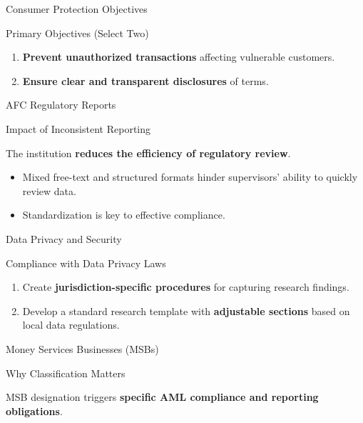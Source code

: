 \documentclass{beamer}
\begin{document}
	\begin{frame}{Consumer Protection Objectives}
		\begin{block}{Primary Objectives (Select Two)}
			\begin{enumerate}
				\item \textbf{Prevent unauthorized transactions} affecting vulnerable customers.
				\item \textbf{Ensure clear and transparent disclosures} of terms.
			\end{enumerate}
		\end{block}
	\end{frame}
	
	\begin{frame}{AFC Regulatory Reports}
		\begin{block}{Impact of Inconsistent Reporting}
			\begin{center}
				The institution \textbf{reduces the efficiency of regulatory review}.
			\end{center}
		\end{block}
		\begin{itemize}
			\item Mixed free-text and structured formats hinder supervisors' ability to quickly review data.
			\item Standardization is key to effective compliance.
		\end{itemize}
	\end{frame}
	
	\begin{frame}{Data Privacy and Security}
		\begin{block}{Compliance with Data Privacy Laws}
			\begin{enumerate}
				\item Create \textbf{jurisdiction-specific procedures} for capturing research findings.
				\item Develop a standard research template with \textbf{adjustable sections} based on local data regulations.
			\end{enumerate}
		\end{block}
	\end{frame}
	
	\begin{frame}{Money Services Businesses (MSBs)}
		\begin{block}{Why Classification Matters}
			\begin{center}
				MSB designation triggers \textbf{specific AML compliance and reporting obligations}.
			\end{center}
		\end{block}
	\end{frame}
	
\end{document}
